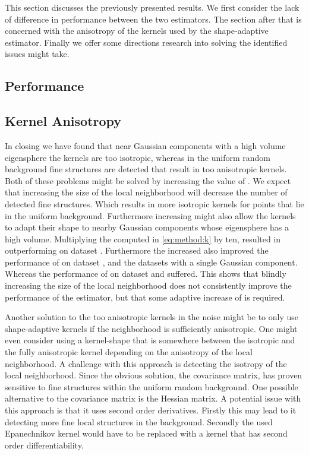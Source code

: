 This section discusses the previously presented results. We first consider the lack of difference in performance between the two estimators. The section after that is concerned with the anisotropy of the kernels used by the shape-adaptive estimator. Finally we offer some directions research into solving the identified issues might take.

\subsection{Performance}
\label{s:discussion:performance}


\subsection{Kernel Anisotropy}
\label{s:discussion:anisotropy}


In closing we have found that near Gaussian components with a high volume eigensphere the kernels are too isotropic, whereas in the uniform random background fine structures are detected that result in too anisotropic kernels. Both of these problems might be solved by increasing the value of \KNNK. 
We expect that increasing the size of the local neighborhood will decrease the number of detected fine structures. Which results in more isotropic kernels for points that lie in the uniform background.
Furthermore increasing \KNNK might also allow the kernels to adapt their shape to nearby Gaussian components whose eigensphere has a high volume. Multiplying the \KNNK computed in \cref{eq:method:k} by ten, resulted in \sambe outperforming \mbe on dataset \baakmanFive. Furthermore the increased \KNNK also improved the performance of \sambe on dataset \ferdosiThree, \baakmanThree and the datasets with a single Gaussian component. Whereas the performance of \sambe on dataset \ferdosiTwo and \baakmanTwo suffered. This shows that blindly increasing the size of the local neighborhood does not consistently improve the performance of the estimator, but that some adaptive increase of \KNNK is required.

Another solution to the too anisotropic kernels in the noise might be to only use shape-adaptive kernels if the neighborhood is sufficiently anisotropic. One might even consider using a kernel-shape that is somewhere between the isotropic and the fully anisotropic kernel depending on the anisotropy of the local neighborhood. A challenge with this approach is detecting the isotropy of the local neighborhood. Since the obvious solution, the covariance matrix, has proven sensitive to fine structures within the uniform random background.
One possible alternative to the covariance matrix is the Hessian matrix. A potential issue with this approach is that it uses second order derivatives. Firstly this may lead to it detecting more fine local structures in the background. Secondly the used Epanechnikov kernel would have to be replaced with a kernel that has second order differentiability.

